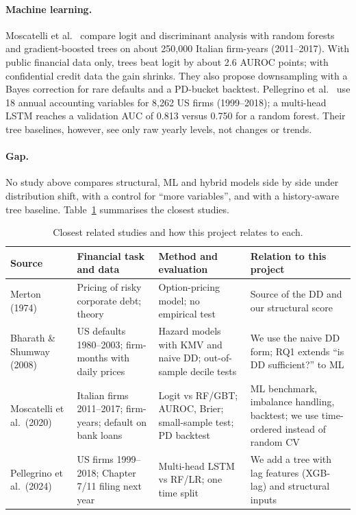 \paragraph{Machine learning.} Moscatelli et al.~\cite{moscatelli2020} compare logit and discriminant
analysis with random forests and gradient-boosted trees on about 250,000 Italian firm-years (2011--2017).
With public financial data only, trees beat logit by about 2.6 AUROC points; with confidential credit
data the gain shrinks. They also propose downsampling with a Bayes correction for rare defaults and a
PD-bucket backtest. Pellegrino et al.~\cite{pellegrino2024} use 18 annual accounting variables for 8,262 US
firms (1999--2018); a multi-head LSTM reaches a validation AUC of 0.813 versus 0.750 for a random forest.
Their tree baselines, however, see only raw yearly levels, not changes or trends.

\paragraph{Gap.} No study above compares structural, ML and hybrid models side by side under distribution
shift, with a control for ``more variables'', and with a history-aware tree baseline.
Table~\ref{tab:prior-work} summarises the closest studies.

\begin{table}[htbp]
\centering
\small
\begin{tabular}{p{.19\linewidth}p{.23\linewidth}p{.23\linewidth}p{.22\linewidth}}
\toprule
Source & Financial task and data & Method and evaluation & Relation to this project \\
\midrule
Merton (1974)~\cite{merton1974} & Pricing of risky corporate debt; theory & Option-pricing model; no empirical test & Source of the DD and our structural score \\
Bharath \& Shumway (2008)~\cite{bharath2008} & US defaults 1980--2003; firm-months with daily prices & Hazard models with KMV and naive DD; out-of-sample decile tests & We use the naive DD form; RQ1 extends ``is DD sufficient?'' to ML \\
Moscatelli et al.\ (2020)~\cite{moscatelli2020} & Italian firms 2011--2017; firm-years; default on bank loans & Logit vs RF/GBT; AUROC, Brier; small-sample test; PD backtest & ML benchmark, imbalance handling, backtest; we use time-ordered instead of random CV \\
Pellegrino et al.\ (2024)~\cite{pellegrino2024} & US firms 1999--2018; Chapter 7/11 filing next year & Multi-head LSTM vs RF/LR; one time split & We add a tree with lag features (XGB-lag) and structural inputs \\
\bottomrule
\end{tabular}
\caption{Closest related studies and how this project relates to each.}
\label{tab:prior-work}
\end{table}

